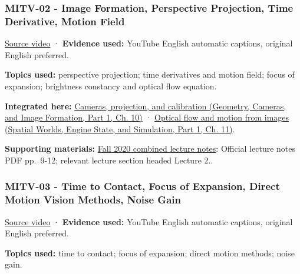 \subsubsection{MITV-02 - Image Formation, Perspective Projection, Time Derivative, Motion Field}\label{04-visual-computing-ii-ch036-mitv-02---image-formation-perspective-projection-time-derivative-motion-field}

\hypertarget{04-visual-computing-ii-ch036-mitv-02---image-formation-perspective-projection-time-derivative-motion-field}{}

\href{https://www.youtube.com/watch?v=uM5AoUgCA00}{Source video} · \textbf{Evidence used:} YouTube English automatic captions, original English preferred.

\textbf{Topics used:} perspective projection; time derivatives and motion field; focus of expansion; brightness constancy and optical flow equation.

\textbf{Integrated here:} \href{../03-Geometry-Cameras-and-Image-Formation-P01/main.pdf\#03-visual-computing-i-ch003-cameras-projection-and-calibration}{Cameras, projection, and calibration (Geometry, Cameras, and Image Formation, Part 1, Ch. 10)} · \href{../05-Spatial-Worlds-Engine-State-and-Simulation-P01/main.pdf\#04-visual-computing-ii-ch030-optical-flow-and-motion-from-images}{Optical flow and motion from images (Spatial Worlds, Engine State, and Simulation, Part 1, Ch. 11)}.

\textbf{Supporting materials:} \href{https://ocw.mit.edu/courses/6-801-machine-vision-fall-2020/9ec44f69e72995c370b3797818ba01e6_MIT6_801F20_lectureNotes.pdf}{Fall 2020 combined lecture notes}: Official lecture notes PDF pp.~9-12; relevant lecture section headed Lecture 2..

\subsubsection{MITV-03 - Time to Contact, Focus of Expansion, Direct Motion Vision Methods, Noise Gain}\label{04-visual-computing-ii-ch036-mitv-03---time-to-contact-focus-of-expansion-direct-motion-vision-methods-noise-gain}

\hypertarget{04-visual-computing-ii-ch036-mitv-03---time-to-contact-focus-of-expansion-direct-motion-vision-methods-noise-gain}{}

\href{https://www.youtube.com/watch?v=t9w_WuyVJ-A}{Source video} · \textbf{Evidence used:} YouTube English automatic captions, original English preferred.

\textbf{Topics used:} time to contact; focus of expansion; direct motion methods; noise gain.


